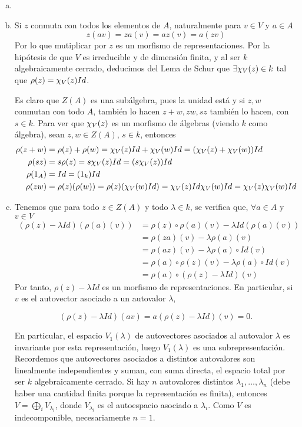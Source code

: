 \documentclass[twoside]{article}
\begin{document}
\begin{solucion}
\begin{enumerate}[(a)]
\item[]
\item Si $z$ conmuta con todos los elementos de $A$, naturalmente para $v\in V$ y $a\in A$
$$
z(av) = za(v) = az(v)=a(zv)
$$ 
Por lo que mutiplicar por $z$ es un morfismo de representaciones. Por la hipótesis de que $V$ es irreducible y de dimensión finita, y al ser $k$ algebraicamente cerrado, deducimos del Lema de Schur que $\exists \chi_V(z) \in k$ tal que $\rho(z)=\chi_V(z)Id$.

Es claro que $Z(A)$ es una subálgebra, pues la unidad está y si $z,w$ conmutan con todo $A$, también lo hacen $z+w,zw,sz$ también lo hacen, con $s\in k$. Para ver que $\chi_V(z)$ es un morfismo de álgebras (viendo $k$ como álgebra), sean $z,w\in Z(A)$, $s \in k$, entonces
\begin{align*}
\rho(z+w) &= \rho(z)+\rho(w) = \chi_V(z)Id + \chi_V(w)Id = (\chi_V(z)+\chi_V(w))Id \\
\rho(sz) &= s\rho(z) = s\chi_V(z)Id = (s\chi_V(z))Id\\
\rho(1_A)&=Id = (1_k)Id\\
\rho(zw) &= \rho(z)(\rho(w)) =\rho(z)(\chi_V(w)Id) = \chi_V(z)Id\chi_V(w)Id = \chi_V(z)\chi_V(w)Id
\end{align*}
\item Tenemos que para todo $z\in Z(A)$ y todo $\lambda\in k$,  se verifica que, $\forall a \in A$ y $v \in V$
\begin{align*}
(\rho(z)-\lambda Id)(\rho(a)(v)) &= \rho(z)\circ \rho(a)(v) - \lambda Id (\rho(a)(v)) \\
&= \rho(za)(v) - \lambda \rho(a)(v)\\
&= \rho(az)(v) - \lambda \rho(a) \circ Id (v)\\
&= \rho(a) \circ \rho(z)(v) - \lambda \rho(a)\circ Id(v)\\
&= \rho(a)\circ ( \rho(z) - \lambda Id) (v)
\end{align*}
Por tanto, $\rho(z)-\lambda Id$ es un morfismo de representaciones. En particular, si $v$ es el autovector asociado a un autovalor $\lambda$, 

$$(\rho(z)-\lambda Id)(av)=a(\rho(z)-\lambda Id)(v)=0.$$

En particular, el espacio $V_1(\lambda)$ de autovectores asociados al autovalor $\lambda$ es invariante por esta representación, luego $V_1(\lambda)$ es una subrepresentación. Recordemos que autovectores asociados a distintos autovalores son linealmente independientes y suman, con suma directa, el espacio total por ser $k$ algebraicamente cerrado. Si hay $n$ autovalores distintos $\lambda_1,\dots, \lambda_n$ (debe haber una cantidad finita porque la representación es finita), entonces $V=\bigoplus_i V_{\lambda_i}$, donde $V_{\lambda_i}$ es el autoespacio asociado a $\lambda_i$. Como $V$ es indecomponible, necesariamente $n=1$.



\end{enumerate}
\end{solucion}
\end{document}
